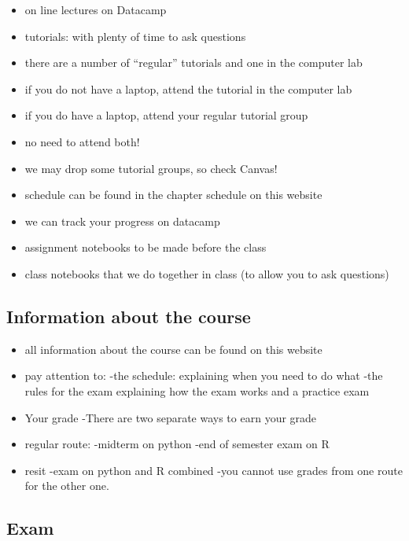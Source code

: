 \documentclass[]{book}
\providecommand{\tightlist}{%
  \setlength{\itemsep}{0pt}\setlength{\parskip}{0pt}}
\begin{document}
\begin{itemize}
\tightlist
\item
  on line lectures on Datacamp
\item
  tutorials: with plenty of time to ask questions
\item
  there are a number of ``regular'' tutorials and one in the computer lab
\item
  if you do not have a laptop, attend the tutorial in the computer lab
\item
  if you do have a laptop, attend your regular tutorial group
\item
  no need to attend both!
\item
  we may drop some tutorial groups, so check Canvas!
\item
  schedule can be found in the chapter schedule on this website
\item
  we can track your progress on datacamp
\item
  assignment notebooks to be made before the class
\item
  class notebooks that we do together in class (to allow you to ask questions)
\end{itemize}

\hypertarget{information-about-the-course}{%
\subsection{Information about the course}\label{information-about-the-course}}

\begin{itemize}
\item
  all information about the course can be found on this website
\item
  pay attention to:
  -the schedule: explaining when you need to do what
  -the rules for the exam explaining how the exam works and a practice exam
\item
  Your grade
  -There are two separate ways to earn your grade
\item
  regular route:
  -midterm on python
  -end of semester exam on R
\item
  resit
  -exam on python and R combined
  -you cannot use grades from one route for the other one.
\end{itemize}

\hypertarget{exam}{%
\subsection{Exam}\label{exam}}
\end{document}
